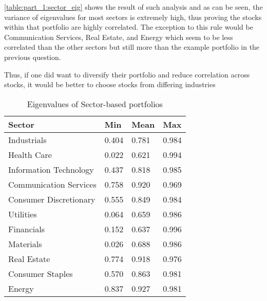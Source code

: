 \autoref{table:part_1:sector_eig} shows the result of such analysis and as can be seen, the variance of eigenvalues for most sectors is extremely high, thus proving the stocks within that portfolio are highly correlated. The exception to this rule would be Communication Services, Real Estate, and Energy which seem to be less correlated than the other sectors but still more than the example portfolio in the previous question.

Thus, if one did want to diversify their portfolio and reduce correlation across stocks, it would be better to choose stocks from differing industries

\begin{table}[]
    \centering
    \begin{tabular}{l|l|l|l}
    Sector & Min      & Mean     & Max     \\ \hline
    Industrials & 0.404   & 0.781  & 0.984  \\
    Health Care	& 0.022   & 0.621  & 0.994  \\
    Information Technology	& 0.437  & 0.818  & 0.985  \\
    Communication Services	& 0.758  & 0.920  & 0.969  \\
    Consumer Discretionary	& 0.555   & 0.849  & 0.984  \\
    Utilities	& 0.064   & 0.659  & 0.986  \\
    Financials	& 0.152  & 0.637  & 0.996 \\
    Materials		& 0.026   & 0.688  & 0.986 \\
    Real Estate		& 0.774  & 0.918  & 0.976  \\
    Consumer Staples		& 0.570   & 0.863  & 0.981  \\
    Energy		& 0.837  & 0.927 & 0.981  \\
    \end{tabular}
    \caption{Eigenvalues of Sector-based portfolios}
    \label{table:part_1:sector_eig}
\end{table}